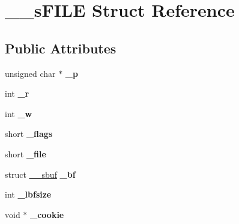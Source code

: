 \hypertarget{struct____s_f_i_l_e}{}\section{\+\_\+\+\_\+s\+F\+I\+LE Struct Reference}
\label{struct____s_f_i_l_e}
\subsection*{Public Attributes}
\begin{DoxyCompactItemize}
\item 
unsigned char $\ast$ {\bfseries \+\_\+p}\hypertarget{struct____s_f_i_l_e_ae2e7092f8d413139f1be58d148a8cb02}{}\label{struct____s_f_i_l_e_ae2e7092f8d413139f1be58d148a8cb02}

\item 
int {\bfseries \+\_\+r}\hypertarget{struct____s_f_i_l_e_aba617bc1558f092e8295e6a4900c5482}{}\label{struct____s_f_i_l_e_aba617bc1558f092e8295e6a4900c5482}

\item 
int {\bfseries \+\_\+w}\hypertarget{struct____s_f_i_l_e_a81311ca4ccc83e563b7f10064295312f}{}\label{struct____s_f_i_l_e_a81311ca4ccc83e563b7f10064295312f}

\item 
short {\bfseries \+\_\+flags}\hypertarget{struct____s_f_i_l_e_ad07ed1be5a6ead8073c384ec2062ce8f}{}\label{struct____s_f_i_l_e_ad07ed1be5a6ead8073c384ec2062ce8f}

\item 
short {\bfseries \+\_\+file}\hypertarget{struct____s_f_i_l_e_a2525c0a6d3422d10f3fa3ac321d91d97}{}\label{struct____s_f_i_l_e_a2525c0a6d3422d10f3fa3ac321d91d97}

\item 
struct \hyperlink{struct____sbuf}{\+\_\+\+\_\+sbuf} {\bfseries \+\_\+bf}\hypertarget{struct____s_f_i_l_e_a7988945fd3850bbaef26db0c445d4ef6}{}\label{struct____s_f_i_l_e_a7988945fd3850bbaef26db0c445d4ef6}

\item 
int {\bfseries \+\_\+lbfsize}\hypertarget{struct____s_f_i_l_e_a5dab74c613194a677951c59e95bc56c9}{}\label{struct____s_f_i_l_e_a5dab74c613194a677951c59e95bc56c9}

\item 
void $\ast$ {\bfseries \+\_\+cookie}\hypertarget{struct____s_f_i_l_e_a54f35bf07a091d83d539d1e0dd57584c}{}\label{struct____s_f_i_l_e_a54f35bf07a091d83d539d1e0dd57584c}


\end{DoxyCompactItemize}

